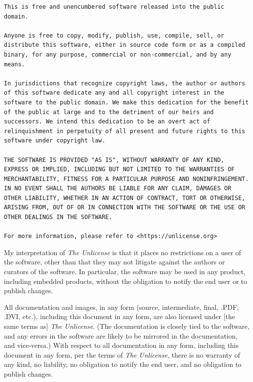 \begin{small}
\begin{verbatim}
This is free and unencumbered software released into the public domain.

Anyone is free to copy, modify, publish, use, compile, sell, or
distribute this software, either in source code form or as a compiled
binary, for any purpose, commercial or non-commercial, and by any
means.

In jurisdictions that recognize copyright laws, the author or authors
of this software dedicate any and all copyright interest in the
software to the public domain. We make this dedication for the benefit
of the public at large and to the detriment of our heirs and
successors. We intend this dedication to be an overt act of
relinquishment in perpetuity of all present and future rights to this
software under copyright law.

THE SOFTWARE IS PROVIDED "AS IS", WITHOUT WARRANTY OF ANY KIND,
EXPRESS OR IMPLIED, INCLUDING BUT NOT LIMITED TO THE WARRANTIES OF
MERCHANTABILITY, FITNESS FOR A PARTICULAR PURPOSE AND NONINFRINGEMENT.
IN NO EVENT SHALL THE AUTHORS BE LIABLE FOR ANY CLAIM, DAMAGES OR
OTHER LIABILITY, WHETHER IN AN ACTION OF CONTRACT, TORT OR OTHERWISE,
ARISING FROM, OUT OF OR IN CONNECTION WITH THE SOFTWARE OR THE USE OR
OTHER DEALINGS IN THE SOFTWARE.

For more information, please refer to <https://unlicense.org>
\end{verbatim}
\end{small}

My interpretation of \emph{The Unlicense} is that it places no restrictions
on a user of the software, other than that they may not litigate against
the authors or curators of the software.  In particular, the software may
be used in any product, including embedded products, without the obligation
to notify the end user or to publish changes.

All documentation and images, in any form (source, intermediate, final, .PDF,
.DVI, etc.), including this document in any form, are also licensed under [the same
terms as] \emph{The Unlicense}. (The documentation is closely tied to the software,
and any errors in the software are likely to be mirrored in the documentation,
and vice-versa.)  With respect to all documentation in any form, including this
document in any form, per the
terms of \emph{The Unlicense}, there is no warranty of any kind, no liability,
no obligation to notify the end user, and
no obligation to publish changes.


